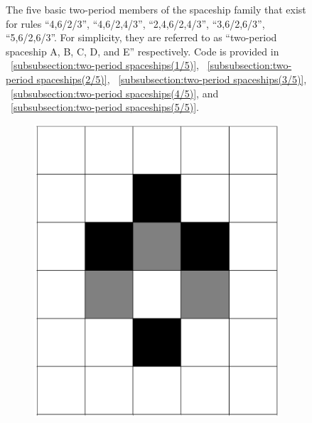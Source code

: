 \documentclass[12pt]{article}
\numberwithin{figure}{section} %
\begin{document}
\begin{figure}[H]
	\caption[Two-period spaceships]{The five basic two-period members of the spaceship family that exist for rules “4,6/2/3”, “4,6/2,4/3”, “2,4,6/2,4/3”, “3,6/2,6/3”, “5,6/2,6/3”. For simplicity, they are referred to as “two-period spaceship A, B, C, D, and E” respectively. Code is provided in ~\ref{subsubsection:two-period spaceships(1/5)}, ~\ref{subsubsection:two-period spaceships(2/5)}, ~\ref{subsubsection:two-period spaceships(3/5)}, ~\ref{subsubsection:two-period spaceships(4/5)}, and ~\ref{subsubsection:two-period spaceships(5/5)}.}
   	\label{fig:two-period spaceships}
   	\vspace{-1.5em}
\end{figure}

\begin{figure}[H]
	\begin{subfigure}{0.18\textwidth}
     		\centering
     		\includegraphics[angle=270,width=\linewidth]{Section4/8.0}
    		\subcaption{}
   	\end{subfigure}
     	\begin{subfigure}{0.18\textwidth}
     		\centering

\end{subfigure}
\end{figure}
\end{document}
